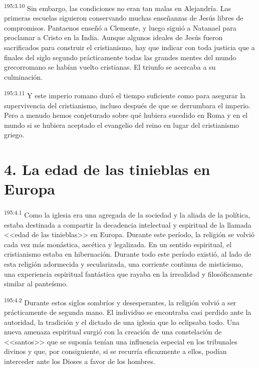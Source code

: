 \par 
\textsuperscript{195:3.10} Sin embargo, las condiciones no eran tan malas en Alejandría. Las primeras escuelas siguieron conservando muchas enseñanzas de Jesús libres de compromisos. Pantaenos enseñó a Clemente, y luego siguió a Natanael para proclamar a Cristo en la India. Aunque algunos ideales de Jesús fueron sacrificados para construir el cristianismo, hay que indicar con toda justicia que a finales del siglo segundo prácticamente todas las grandes mentes del mundo grecorromano se habían vuelto cristianas. El triunfo se acercaba a su culminación.

\par 
\textsuperscript{195:3.11} Y este imperio romano duró el tiempo suficiente como para asegurar la supervivencia del cristianismo, incluso después de que se derrumbara el imperio. Pero a menudo hemos conjeturado sobre qué hubiera sucedido en Roma y en el mundo si se hubiera aceptado el evangelio del reino en lugar del cristianismo griego.

\section*{4. La edad de las tinieblas en Europa}
\par 
\textsuperscript{195:4.1} Como la iglesia era una agregada de la sociedad y la aliada de la política, estaba destinada a compartir la decadencia intelectual y espiritual de la llamada <<edad de las tinieblas>> en Europa. Durante este período, la religión se volvió cada vez más monástica, ascética y legalizada. En un sentido espiritual, el cristianismo estaba en hibernación. Durante todo este período existió, al lado de esta religión adormecida y secularizada, una corriente continua de misticismo, una experiencia espiritual fantástica que rayaba en la irrealidad y filosóficamente similar al panteísmo.

\par 
\textsuperscript{195:4.2} Durante estos siglos sombríos y desesperantes, la religión volvió a ser prácticamente de segunda mano. El individuo se encontraba casi perdido ante la autoridad, la tradición y el dictado de una iglesia que lo eclipsaba todo. Una nueva amenaza espiritual surgió con la creación de una constelación de <<santos>> que se suponía tenían una influencia especial en los tribunales divinos y que, por consiguiente, si se recurría eficazmente a ellos, podían interceder ante los Dioses a favor de los hombres.

